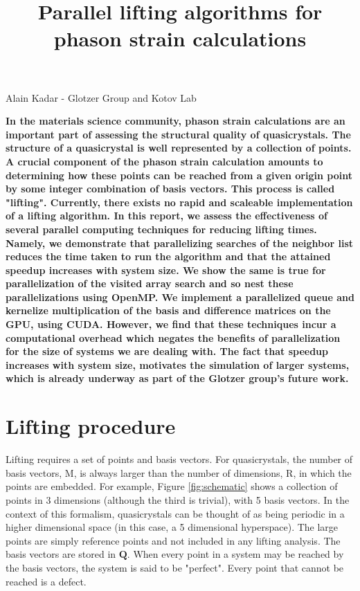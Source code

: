 \documentclass{article}
\begin{document}
\doublespacing
\title{Parallel lifting algorithms for phason strain calculations}
\maketitle
Alain Kadar - Glotzer Group and Kotov Lab

\vspace{1cm}

\textbf{In the materials science community, phason strain calculations are an important part of assessing the structural quality of quasicrystals. The structure of a quasicrystal is well represented by a collection of points. A crucial component of the phason strain calculation amounts to determining how these points can be reached from a given origin point by some integer combination of basis vectors. This process is called "lifting". Currently, there exists no rapid and scaleable implementation of a lifting algorithm. In this report, we assess the effectiveness of several parallel computing techniques for reducing lifting times. Namely, we demonstrate that parallelizing searches of the neighbor list reduces the time taken to run the algorithm and that the attained speedup increases with system size. We show the same is true for parallelization of the visited array search and so nest these parallelizations using OpenMP. We implement a parallelized queue and kernelize multiplication of the basis and difference matrices on the GPU, using CUDA. However, we find that these techniques incur a computational overhead which negates the benefits of parallelization for the size of systems we are dealing with. The fact that speedup increases with system size, motivates the simulation of larger systems, which is already underway as part of the Glotzer group's future work.}


\section{Lifting procedure}
Lifting requires a set of points and basis vectors. For quasicrystals, the number of basis vectors, M, is always larger than the number of dimensions, R, in which the points are embedded. For example, Figure \ref{fig:schematic} shows a collection of points in 3 dimensions (although the third is trivial), with 5 basis vectors. In the context of this formalism, quasicrystals can be thought of as being periodic in a higher dimensional space (in this case, a 5 dimensional hyperspace). The large points are simply reference points and not included in any lifting analysis. The basis vectors are stored in $\mathbf{Q}$. When every point in a system may be reached by the basis vectors, the system is said to be "perfect". Every point that cannot be reached is a defect.
\end{document}
